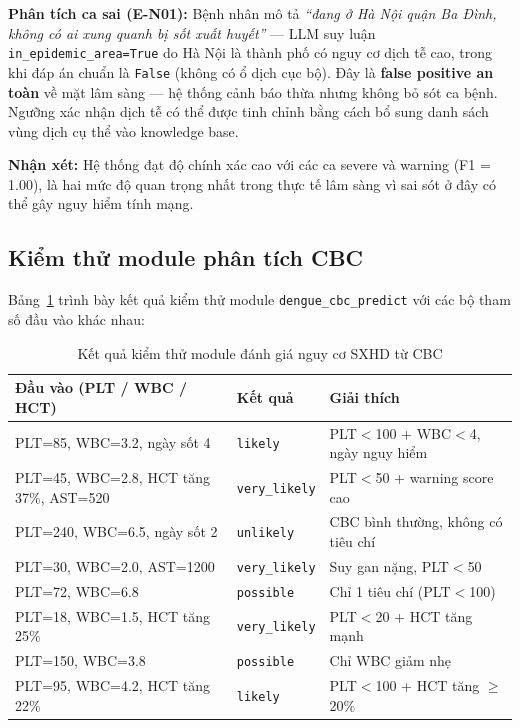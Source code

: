 \documentclass[a4paper,13pt,3p,oneside]{report}
\theoremstyle{definition}
\theoremstyle{remark}
\theoremstyle{definition}
\begin{document}
\textbf{Phân tích ca sai (E-N01):} Bệnh nhân mô tả \textit{``đang ở Hà Nội quận Ba Đình, không có ai xung quanh bị sốt xuất huyết''} — LLM suy luận \texttt{in\_epidemic\_area=True} do Hà Nội là thành phố có nguy cơ dịch tễ cao, trong khi đáp án chuẩn là \texttt{False} (không có ổ dịch cục bộ). Đây là \textbf{false positive an toàn} về mặt lâm sàng — hệ thống cảnh báo thừa nhưng không bỏ sót ca bệnh. Ngưỡng xác nhận dịch tễ có thể được tinh chỉnh bằng cách bổ sung danh sách vùng dịch cụ thể vào knowledge base.

\textbf{Nhận xét:} Hệ thống đạt độ chính xác cao với các ca severe và warning (F1 = 1.00), là hai mức độ quan trọng nhất trong thực tế lâm sàng vì sai sót ở đây có thể gây nguy hiểm tính mạng.

\subsection{Kiểm thử module phân tích CBC}

Bảng~\ref{tab:cbc-test} trình bày kết quả kiểm thử module \texttt{dengue\_cbc\_predict} với các bộ tham số đầu vào khác nhau:

\begin{table}[H]
\centering
\begin{tabular}{|p{4.5cm}|p{2.5cm}|p{5.2cm}|}
\hline
\textbf{Đầu vào (PLT / WBC / HCT)} & \textbf{Kết quả} & \textbf{Giải thích} \\
\hline
PLT=85, WBC=3.2, ngày sốt 4 & \texttt{likely} & PLT$<$100 + WBC$<$4, ngày nguy hiểm \\
\hline
PLT=45, WBC=2.8, HCT tăng 37\%, AST=520 & \texttt{very\_likely} & PLT$<$50 + warning score cao \\
\hline
PLT=240, WBC=6.5, ngày sốt 2 & \texttt{unlikely} & CBC bình thường, không có tiêu chí \\
\hline
PLT=30, WBC=2.0, AST=1200 & \texttt{very\_likely} & Suy gan nặng, PLT$<$50 \\
\hline
PLT=72, WBC=6.8 & \texttt{possible} & Chỉ 1 tiêu chí (PLT$<$100) \\
\hline
PLT=18, WBC=1.5, HCT tăng 25\% & \texttt{very\_likely} & PLT$<$20 + HCT tăng mạnh \\
\hline
PLT=150, WBC=3.8 & \texttt{possible} & Chỉ WBC giảm nhẹ \\
\hline
PLT=95, WBC=4.2, HCT tăng 22\% & \texttt{likely} & PLT$<$100 + HCT tăng $\geq$20\% \\
\hline
\end{tabular}
\caption{Kết quả kiểm thử module đánh giá nguy cơ SXHD từ CBC}
\label{tab:cbc-test}
\end{table}
\end{document}
